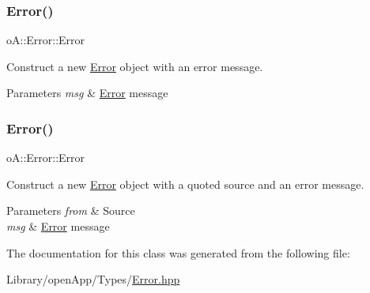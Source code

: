 \subsubsection{\texorpdfstring{Error()}{Error()}\hspace{0.1cm}{\footnotesize\ttfamily [1/2]}}
{\footnotesize\ttfamily o\+A\+::\+Error\+::\+Error\hspace{0.3cm}{\ttfamily [inline]}}



Construct a new \mbox{\hyperlink{classo_a_1_1_error}{Error}} object with an error message. 


\begin{DoxyParams}{Parameters}
{\em msg} & \mbox{\hyperlink{classo_a_1_1_error}{Error}} message \\
\hline
\end{DoxyParams}
\mbox{\label{classo_a_1_1_cast_error_adf66492ca8b03fa14d09e5bba7cdacbd}} 
\subsubsection{\texorpdfstring{Error()}{Error()}\hspace{0.1cm}{\footnotesize\ttfamily [2/2]}}
{\footnotesize\ttfamily o\+A\+::\+Error\+::\+Error\hspace{0.3cm}{\ttfamily [inline]}}



Construct a new \mbox{\hyperlink{classo_a_1_1_error}{Error}} object with a quoted source and an error message. 


\begin{DoxyParams}{Parameters}
{\em from} & Source \\
\hline
{\em msg} & \mbox{\hyperlink{classo_a_1_1_error}{Error}} message \\
\hline
\end{DoxyParams}


The documentation for this class was generated from the following file\+:\begin{DoxyCompactItemize}
\item 
Library/open\+App/\+Types/\mbox{\hyperlink{_error_8hpp}{Error.\+hpp}}\end{DoxyCompactItemize}
